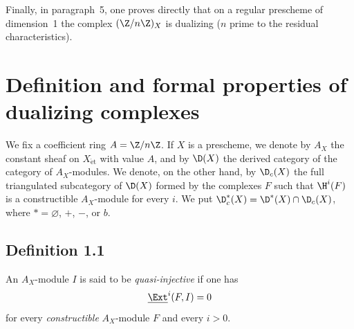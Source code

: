 Finally, in paragraph~5, one proves directly that on a regular prescheme of dimension~1 the complex $(\Z/n\Z)_X$ is dualizing ($n$ prime to the residual characteristics).

\section{Definition and formal properties of dualizing complexes}

We fix a coefficient ring $A = \Z/n\Z$. If $X$ is a prescheme, we denote by $A_X$ the constant sheaf on $X_{\mathrm{\acute{e}t}}$ with value $A$, and by $\D(X)$ the derived category of the category of $A_X$-modules. We denote, on the other hand, by $\D_c(X)$ the full triangulated subcategory of $\D(X)$ formed by the complexes $F$ such that $\H^i(F)$ is a constructible $A_X$-module for every $i$. We put $\D_c^{*}(X) = \D^{*}(X) \cap \D_c(X)$, where $* = \varnothing$, $+$, $-$, or $b$.

\subsection*{Definition 1.1}
An $A_X$-module $I$ is said to be \emph{quasi-injective} if one has
\[
\underline{\Ext}^i(F,I) = 0
\]
for every \emph{constructible} $A_X$-module $F$ and every $i > 0$.

